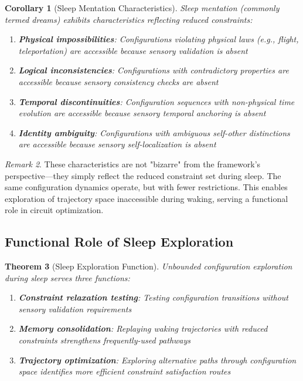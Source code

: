 \documentclass[aps,prd,twocolumn,superscriptaddress,floatfix,nofootinbib]{revtex4-2}
\newtheorem{theorem}{Theorem}[section]
\newtheorem{corollary}[theorem]{Corollary}
\theoremstyle{remark}
\newtheorem{remark}[theorem]{Remark}
\begin{document}
\begin{corollary}[Sleep Mentation Characteristics]
\label{cor:sleep_characteristics}
Sleep mentation (commonly termed dreams) exhibits characteristics reflecting reduced constraints:
\begin{enumerate}
\item \textbf{Physical impossibilities}: Configurations violating physical laws (e.g., flight, teleportation) are accessible because sensory validation is absent
\item \textbf{Logical inconsistencies}: Configurations with contradictory properties are accessible because sensory consistency checks are absent
\item \textbf{Temporal discontinuities}: Configuration sequences with non-physical time evolution are accessible because sensory temporal anchoring is absent
\item \textbf{Identity ambiguity}: Configurations with ambiguous self-other distinctions are accessible because sensory self-localization is absent
\end{enumerate}
\end{corollary}

\begin{remark}
These characteristics are not "bizarre" from the framework's perspective—they simply reflect the reduced constraint set during sleep. The same configuration dynamics operate, but with fewer restrictions. This enables exploration of trajectory space inaccessible during waking, serving a functional role in circuit optimization.
\end{remark}

\subsection{Functional Role of Sleep Exploration}

\begin{theorem}[Sleep Exploration Function]
\label{thm:sleep_function}
Unbounded configuration exploration during sleep serves three functions:
\begin{enumerate}
\item \textbf{Constraint relaxation testing}: Testing configuration transitions without sensory validation requirements
\item \textbf{Memory consolidation}: Replaying waking trajectories with reduced constraints strengthens frequently-used pathways
\item \textbf{Trajectory optimization}: Exploring alternative paths through configuration space identifies more efficient constraint satisfaction routes
\end{enumerate}
\end{theorem}
\end{document}
